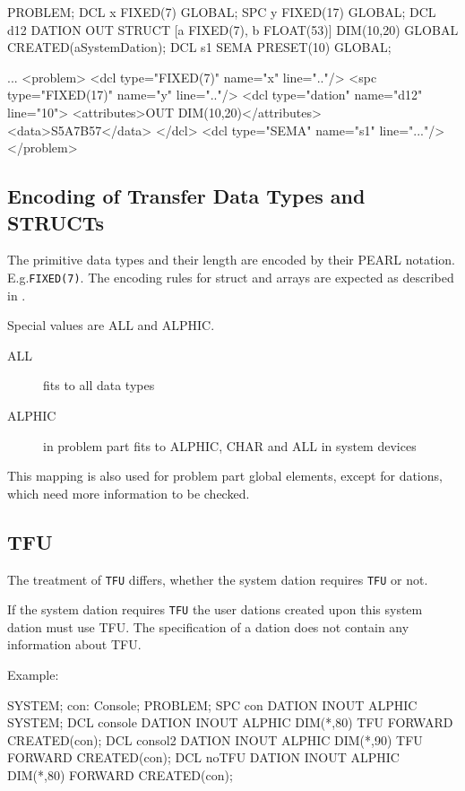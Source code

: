 \begin{PEARLCode}
PROBLEM;
   DCL x FIXED(7) GLOBAL;
   SPC y FIXED(17) GLOBAL;
   DCL d12 DATION OUT STRUCT [a FIXED(7), b FLOAT(53)]
     DIM(10,20)  GLOBAL CREATED(aSystemDation);
   DCL s1 SEMA PRESET(10) GLOBAL;
\end{PEARLCode}

\begin{XMLCode}
...
<problem>
  <dcl type="FIXED(7)" name="x" line=".."/>
  <spc type="FIXED(17)" name="y" line=".."/>
  <dcl type="dation" name="d12" line="10">
    <attributes>OUT DIM(10,20)</attributes>
    <data>S5A7B57</data>
  </dcl>
  <dcl type="SEMA" name="s1" line="..."/>
</problem>
\end{XMLCode}


\subsection{Encoding of Transfer Data Types and STRUCTs}
\label{encoding}
The primitive data types and their length are encoded 
by their PEARL notation.  E.g.\verb|FIXED(7)|. The encoding rules
for struct and arrays are expected as described in \cite{runtime}. 

Special values are ALL and ALPHIC.

\begin{description}
\item[ALL] fits to all data types
\item[ALPHIC] in problem part fits to ALPHIC, CHAR and ALL in system devices
\end{description}

This mapping is also used for problem part global elements, except for dations,
which need more information to be checked.

\subsection{TFU}
The treatment of \texttt{TFU} differs, whether the system dation
requires \texttt{TFU} or not.

If the system dation requires \texttt{TFU}  the user dations created
 upon this system dation must use TFU.
The specification of a dation does not contain any information about TFU.

Example:

\begin{PEARLCode}
SYSTEM;
  con: Console;
PROBLEM;
  SPC con     DATION INOUT ALPHIC SYSTEM;
  DCL console DATION INOUT ALPHIC DIM(*,80) TFU FORWARD CREATED(con);
  DCL consol2 DATION INOUT ALPHIC DIM(*,90) TFU FORWARD CREATED(con);
  DCL noTFU   DATION INOUT ALPHIC DIM(*,80)     FORWARD CREATED(con);
\end{PEARLCode}

